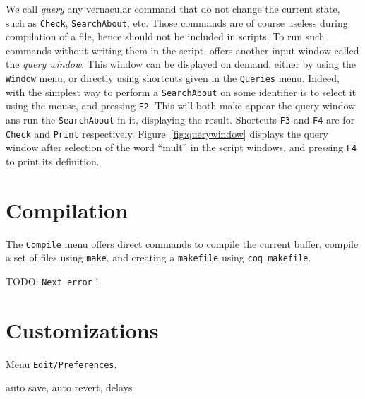 We call \emph{query} any vernacular command that do not change the
current state, such as \verb|Check|, \verb|SearchAbout|, etc. Those
commands are of course useless during compilation of a file, hence
should not be included in scripts. To run such commands without
writing them in the script, \coqide{} offers another input window
called the \emph{query window}. This window can be displayed on
demand, either by using the \texttt{Window} menu, or directly using
shortcuts given in the \texttt{Queries} menu. Indeed, with \coqide{}
the simplest way to perform a \texttt{SearchAbout} on some identifier
is to select it using the mouse, and pressing \verb|F2|. This will
both make appear the query window ans run the \texttt{SearchAbout} in
it, displaying the result. Shortcuts \verb|F3| and \verb|F4| are for
\verb|Check| and \verb|Print| respectively.
Figure~\ref{fig:querywindow} displays the query window after selection
of the word ``mult'' in the script windows, and pressing \verb|F4| to
print its definition.

\section{Compilation}

The \verb|Compile| menu offers direct commands to compile the current
buffer, compile a set of files using \verb|make|, and creating a
\verb|makefile| using \verb|coq_makefile|.

TODO: \verb|Next error| !

\section{Customizations}

Menu \texttt{Edit/Preferences}.

auto save, auto revert, delays



